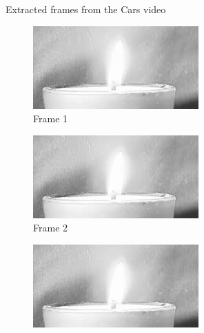 \documentclass{article}
\begin{document}
\begin{enumerate}
\begin{figure}[h!]
    \caption{Extracted frames from the Cars video}
    \label{fig:cars_frames}
\end{figure}


\begin{figure}[h!]
    \centering
    \begin{subfigure}{0.24\textwidth}
        \centering
        \includegraphics[width=\linewidth]{../images/flame/frame = 1.png}
        \caption{Frame 1}
    \end{subfigure}
    \begin{subfigure}{0.24\textwidth}
        \centering
        \includegraphics[width=\linewidth]{../images/flame/frame = 2.png}
        \caption{Frame 2}
    \end{subfigure}
    \begin{subfigure}{0.24\textwidth}
        \centering
        \includegraphics[width=\linewidth]{../images/flame/frame = 3.png}

\end{subfigure}
\end{figure}
\end{enumerate}
\end{document}
